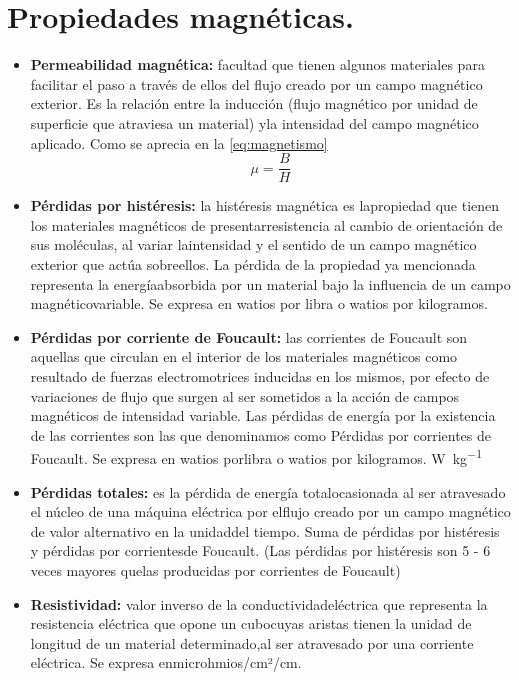 \documentclass[12pt,a4paper]{article}
\begin{document}
\section{Propiedades magnéticas.}
\begin{itemize}
    \item \textbf{Permeabilidad magnética:} facultad que tienen algunos materiales para facilitar el paso a través de ellos del flujo creado por un campo magnético exterior. Es la relación entre la inducción (flujo magnético por unidad de superficie que atraviesa un material) yla intensidad del campo magnético aplicado. Como se aprecia en la \autoref{eq:magnetismo}
    \begin{equation} \label{eq:magnetismo}
        \mu  = \frac{B}{H}
    \end{equation}
    \item \textbf{Pérdidas por histéresis:} la histéresis magnética es lapropiedad que tienen los materiales magnéticos de presentarresistencia al cambio de orientación de sus moléculas, al variar laintensidad y el sentido de un campo magnético exterior que actúa sobreellos. La pérdida de la propiedad ya mencionada representa la energíaabsorbida por un material bajo la influencia de un campo magnéticovariable. Se expresa en watios por libra o watios por kilogramos.
    \item \textbf{Pérdidas por corriente de Foucault:} las corrientes de Foucault son aquellas que circulan en el interior de los materiales magnéticos como resultado de fuerzas electromotrices inducidas en los mismos, por efecto de variaciones de flujo que surgen al ser sometidos a la acción de campos magnéticos de intensidad variable. Las pérdidas de energía por la existencia de las corrientes son las que denominamos como \textacutedbl{}Pérdidas por corrientes de Foucault\textacutedbl{}. Se expresa en watios porlibra o watios por kilogramos. \si{\watt\per\kilogram}
    \item \textbf{Pérdidas totales:} es la pérdida de energía totalocasionada al ser atravesado el núcleo de una máquina eléctrica por elflujo creado por un campo magnético de valor alternativo en la unidaddel tiempo. Suma de pérdidas por histéresis y pérdidas por corrientesde Foucault. (Las pérdidas por histéresis son 5 - 6 veces mayores quelas producidas por corrientes de Foucault)
    \item \textbf{Resistividad:} valor inverso de la conductividadeléctrica que representa la resistencia eléctrica que opone un cubocuyas aristas tienen la unidad de longitud de un material determinado,al ser atravesado por una corriente eléctrica. Se expresa enmicrohmios/cm²/cm.

\end{itemize}
\end{document}
